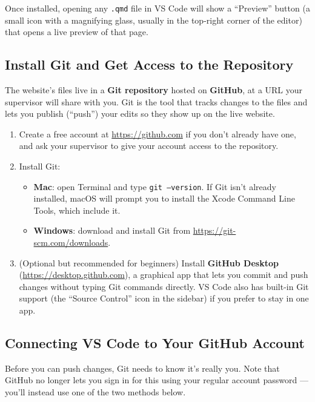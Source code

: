 \documentclass[11pt]{article}
\newcommand{\term}[1]{\textbf{#1}}
\newcommand{\file}[1]{\texttt{#1}}
\newcommand{\cmd}[1]{\texttt{#1}}
\begin{document}
Once installed, opening any \file{.qmd} file in VS Code will show a
``Preview'' button (a small icon with a magnifying glass, usually in the
top-right corner of the editor) that opens a live preview of that page.

\subsection{Install Git and Get Access to the Repository}

The website's files live in a \term{Git repository} hosted on
\term{GitHub}, at a URL your supervisor will share with you. Git is the
tool that tracks changes to the files and lets you publish (``push'') your
edits so they show up on the live website.

\begin{enumerate}
    \item Create a free account at \url{https://github.com} if you don't
    already have one, and ask your supervisor to give your account access
    to the repository.
    \item Install Git:
    \begin{itemize}
        \item \term{Mac}: open Terminal and type \cmd{git --version}. If
        Git isn't already installed, macOS will prompt you to install the
        Xcode Command Line Tools, which include it.
        \item \term{Windows}: download and install Git from
        \url{https://git-scm.com/downloads}.
    \end{itemize}
    \item (Optional but recommended for beginners) Install
    \term{GitHub Desktop} (\url{https://desktop.github.com}), a graphical
    app that lets you commit and push changes without typing Git commands
    directly. VS Code also has built-in Git support (the ``Source Control''
    icon in the sidebar) if you prefer to stay in one app.
\end{enumerate}

\subsection{Connecting VS Code to Your GitHub Account}
\label{sec:git-auth}

Before you can push changes, Git needs to know it's really you. Note that
GitHub no longer lets you sign in for this using your regular account
password --- you'll instead use one of the two methods below.
\end{document}
